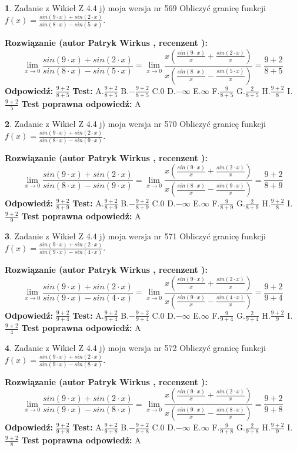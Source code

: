 \documentclass[12pt, a4paper]{article}
\theoremstyle{definition} %
\newtheorem{zad}{}
\newcommand{\zadStart}[1]{\begin{zad}#1\newline}
\newcommand{\zadStop}{\end{zad}}
\newcommand{\rozwStart}[2]{\noindent \textbf{Rozwiązanie (autor #1 , recenzent #2): }\newline}
\newcommand{\rozwStop}{\newline}
\newcommand{\odpStart}{\noindent \textbf{Odpowiedź:}\newline}
\newcommand{\odpStop}{\newline}
\newcommand{\testStart}{\noindent \textbf{Test:}\newline}
\newcommand{\testStop}{\newline}
\newcommand{\kluczStart}{\noindent \textbf{Test poprawna odpowiedź:}\newline}
\newcommand{\kluczStop}{\newline}
\begin{document}
\zadStart{Zadanie z Wikieł Z 4.4 j) moja wersja nr 569}
Obliczyć granicę funkcji $f(x)=\frac{sin(9\cdot x) +sin(2\cdot x)}{sin(8\cdot x) -sin(5\cdot x)}$.
\zadStop
\rozwStart{Patryk Wirkus}{}
$$\lim\limits_{x\to 0}\frac{sin(9\cdot x) +sin(2\cdot x)}{sin(8\cdot x) -sin(5\cdot x)}=\lim\limits_{x\to 0}\frac{x(\frac{sin(9\cdot x)}{x}+\frac{sin(2\cdot x)}{x})}{x(\frac{sin(8\cdot x)}{x}-\frac{sin(5\cdot x)}{x})}=\frac{9+2}{8+5}$$
\rozwStop
\odpStart
$\frac{9+2}{8+5}$
\odpStop
\testStart
A.$\frac{9+2}{8+5}$
B.$-\frac{9+2}{8+5}$
C.$0$
D.$-\infty$
E.$\infty$
F.$\frac{9}{8+5}$
G.$\frac{2}{8+5}$
H.$\frac{9+2}{8}$
I.$\frac{9+2}{5}$
\testStop
\kluczStart
A
\kluczStop



\zadStart{Zadanie z Wikieł Z 4.4 j) moja wersja nr 570}
Obliczyć granicę funkcji $f(x)=\frac{sin(9\cdot x) +sin(2\cdot x)}{sin(8\cdot x) -sin(9\cdot x)}$.
\zadStop
\rozwStart{Patryk Wirkus}{}
$$\lim\limits_{x\to 0}\frac{sin(9\cdot x) +sin(2\cdot x)}{sin(8\cdot x) -sin(9\cdot x)}=\lim\limits_{x\to 0}\frac{x(\frac{sin(9\cdot x)}{x}+\frac{sin(2\cdot x)}{x})}{x(\frac{sin(8\cdot x)}{x}-\frac{sin(9\cdot x)}{x})}=\frac{9+2}{8+9}$$
\rozwStop
\odpStart
$\frac{9+2}{8+9}$
\odpStop
\testStart
A.$\frac{9+2}{8+9}$
B.$-\frac{9+2}{8+9}$
C.$0$
D.$-\infty$
E.$\infty$
F.$\frac{9}{8+9}$
G.$\frac{2}{8+9}$
H.$\frac{9+2}{8}$
I.$\frac{9+2}{9}$
\testStop
\kluczStart
A
\kluczStop



\zadStart{Zadanie z Wikieł Z 4.4 j) moja wersja nr 571}
Obliczyć granicę funkcji $f(x)=\frac{sin(9\cdot x) +sin(2\cdot x)}{sin(9\cdot x) -sin(4\cdot x)}$.
\zadStop
\rozwStart{Patryk Wirkus}{}
$$\lim\limits_{x\to 0}\frac{sin(9\cdot x) +sin(2\cdot x)}{sin(9\cdot x) -sin(4\cdot x)}=\lim\limits_{x\to 0}\frac{x(\frac{sin(9\cdot x)}{x}+\frac{sin(2\cdot x)}{x})}{x(\frac{sin(9\cdot x)}{x}-\frac{sin(4\cdot x)}{x})}=\frac{9+2}{9+4}$$
\rozwStop
\odpStart
$\frac{9+2}{9+4}$
\odpStop
\testStart
A.$\frac{9+2}{9+4}$
B.$-\frac{9+2}{9+4}$
C.$0$
D.$-\infty$
E.$\infty$
F.$\frac{9}{9+4}$
G.$\frac{2}{9+4}$
H.$\frac{9+2}{9}$
I.$\frac{9+2}{4}$
\testStop
\kluczStart
A
\kluczStop



\zadStart{Zadanie z Wikieł Z 4.4 j) moja wersja nr 572}
Obliczyć granicę funkcji $f(x)=\frac{sin(9\cdot x) +sin(2\cdot x)}{sin(9\cdot x) -sin(8\cdot x)}$.
\zadStop
\rozwStart{Patryk Wirkus}{}
$$\lim\limits_{x\to 0}\frac{sin(9\cdot x) +sin(2\cdot x)}{sin(9\cdot x) -sin(8\cdot x)}=\lim\limits_{x\to 0}\frac{x(\frac{sin(9\cdot x)}{x}+\frac{sin(2\cdot x)}{x})}{x(\frac{sin(9\cdot x)}{x}-\frac{sin(8\cdot x)}{x})}=\frac{9+2}{9+8}$$
\rozwStop
\odpStart
$\frac{9+2}{9+8}$
\odpStop
\testStart
A.$\frac{9+2}{9+8}$
B.$-\frac{9+2}{9+8}$
C.$0$
D.$-\infty$
E.$\infty$
F.$\frac{9}{9+8}$
G.$\frac{2}{9+8}$
H.$\frac{9+2}{9}$
I.$\frac{9+2}{8}$
\testStop
\kluczStart
A
\kluczStop
\end{document}
